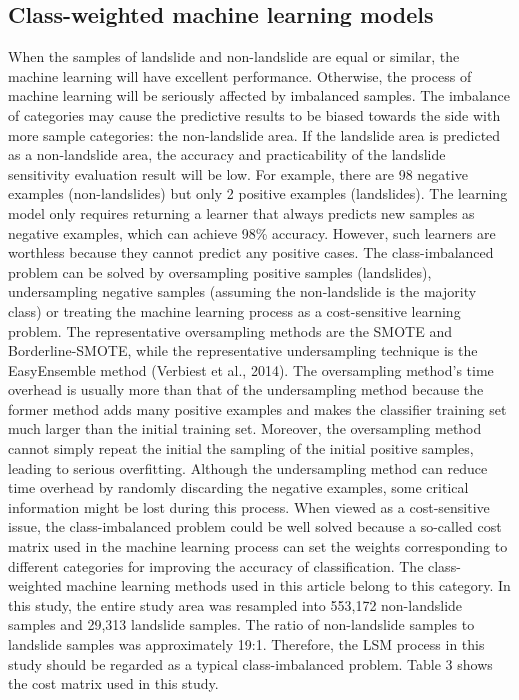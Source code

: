 \documentclass[a4paper,fleqn]{cas-sc}
\begin{document}
\subsection{Class-weighted machine learning models}

When the samples of landslide and non-landslide are equal or similar, the machine learning will have excellent performance. 
Otherwise, the process of machine learning will be seriously affected by imbalanced samples. 
The imbalance of categories may cause the predictive results to be biased towards the side with more sample categories: the non-landslide area. 
If the landslide area is predicted as a non-landslide area, the accuracy and practicability of the landslide sensitivity evaluation result will be low. 
For example, there are 98 negative examples (non-landslides) but only 2 positive examples (landslides). 
The learning model only requires returning a learner that always predicts new samples as negative examples, which can achieve 98\% accuracy. 
However, such learners are worthless because they cannot predict any positive cases.
The class-imbalanced problem can be solved by oversampling positive samples (landslides), undersampling negative samples (assuming the non-landslide is the majority class) or treating the machine learning process as a cost-sensitive learning problem. 
The representative oversampling methods are the SMOTE and Borderline-SMOTE, while the representative undersampling technique is the EasyEnsemble method (Verbiest et al., 2014). 
The oversampling method's time overhead is usually more than that of the undersampling method because the former method adds many positive examples and makes the classifier training set much larger than the initial training set. 
Moreover, the oversampling method cannot simply repeat the initial the sampling of the initial positive samples, leading to serious overfitting. 
Although the undersampling method can reduce time overhead by randomly discarding the negative examples, some critical information might be lost during this process. 
When viewed as a cost-sensitive issue, the class-imbalanced problem could be well solved because a so-called cost matrix used in the machine learning process can set the weights corresponding to different categories for improving the accuracy of classification. 
The class-weighted machine learning methods used in this article belong to this category.
In this study, the entire study area was resampled into 553,172 non-landslide samples and 29,313 landslide samples. 
The ratio of non-landslide samples to landslide samples was approximately 19:1. 
Therefore, the LSM process in this study should be regarded as a typical class-imbalanced problem. 
Table 3 shows the cost matrix used in this study.
\end{document}
